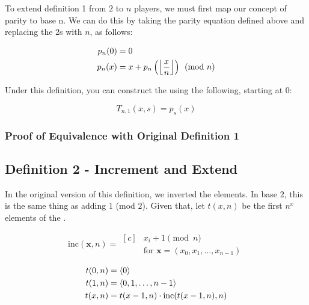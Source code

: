 \documentclass[conference]{IEEEtran}
\begin{document}
To extend definition 1 from $2$ to $n$ players, we must first map our concept of parity to base n. We can do this by taking the parity equation defined above and replacing the $2$s with $n$, as follows:

\begin{equation}
    \begin{aligned}
        p_n(0) &= 0 \\
        p_n(x) &= x + p_n\left(\left\lfloor \dfrac{x}{n} \right\rfloor\right) \pmod{n}
    \end{aligned}
\end{equation}

Under this definition, you can construct the \TMS using the following, starting at 0:

\begin{equation}
    T_{n,1}(x, s) = p_s(x)
\end{equation}

\subsubsection{Proof of Equivalence with Original Definition 1}

\subsection{Definition 2 - Increment and Extend}

In the original version of this definition, we inverted the elements. In base $2$, this is the same thing as adding $1$ (mod $2$). Given that, let $t(x, n)$ be the first $n^x$ elements of the \ETMS.

\begin{equation}
    \text{inc}(\mathbf{x}, n) = \begin{aligned}[c]
            &x_i + 1 \pmod{n} \\
            &\text{for } \mathbf{x} = (x_0, x_1, \ldots, x_{n-1})
    \end{aligned}
\end{equation}

\begin{equation}
    \begin{aligned}
        t(0, n) &= \langle 0 \rangle \\
        t(1, n) &= \langle 0, 1, \ldots, n - 1 \rangle \\
        t(x, n) &= t(x - 1, n) \cdot \text{inc}(t(x - 1, n), n)
    \end{aligned}
\end{equation}
\end{document}
